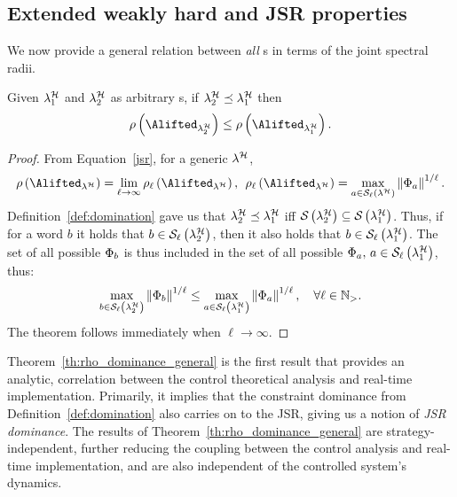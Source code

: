 \subsection{Extended weakly hard and JSR properties}
\label{sec:analytic_results}
We now provide a general relation between \emph{all} \ewhc{}s in terms of the joint spectral radii.
%
\begin{theorem}
    \label{th:rho_dominance_general}
    Given $\lambda_1^{\mathcal{H}}$ and $\lambda_2^{\mathcal{H}}$ as arbitrary \ewhc{}s, if $\lambda_2^{\mathcal{H}} \preceq \lambda_1^{\mathcal{H}}$ then
    $$
        \rho\funof{\Alifted_{\lambda_2^\strat}} \leq \rho\funof{\Alifted_{\lambda_1^\strat}}.
    $$
%
    \begin{proof}
        From Equation~\eqref{jsr}, for a generic \ewhc{} $\lambda^{\mathcal{H}}$,
        \begin{equation*}
            \rho\left(\Alifted_{\lambda^\strat}\right) = \lim_{\ell\rightarrow \infty} \rho_\ell \left(\Alifted_{\lambda^\strat}\right), \;\, 
            \rho_\ell\left(\Alifted_{\lambda^\strat}\right) = \max_{a \in \sset{\ell}{\lambda^\strat}}\norm{\clmat_{a}}^{1/\ell}.
        \end{equation*}
        Definition~\ref{def:domination} gave us that $\lambda^{\mathcal{H}}_2 \preceq \lambda^{\mathcal{H}}_1$ iff $\mathcal{S}_{}\left( \lambda^{\mathcal{H}}_2 \right) \subseteq \mathcal{S}_{}\left( \lambda^{\mathcal{H}}_1 \right)$.
        Thus, if for a word $b$ it holds that $b \in \mathcal{S}_{\ell}\left( \lambda^{\mathcal{H}}_2 \right)$, then it also holds that $b \in \mathcal{S}_{\ell}\left( \lambda^{\mathcal{H}}_1 \right)$.
        The set of all possible $\Phi_{b}$ is thus included in the set of all possible $\Phi_{a},\, a \in \mathcal{S}_{\ell}\left( \lambda^{\mathcal{H}}_1 \right)$, thus:
        \begin{equation*}
            \max_{b \in \mathcal{S}_{\ell}\left( \lambda^{\mathcal{H}}_2 \right)}\left\lVert\Phi_{b}\right\rVert^{1/\ell} \leq
            \max_{a \in \mathcal{S}_{\ell}\left( \lambda^{\mathcal{H}}_1 \right)}\left\lVert\Phi_{a}\right\rVert^{1/\ell}, \quad \forall \ell \in \mathbb{N}_{>}.
        \end{equation*}
        The theorem follows immediately when $\ell\rightarrow \infty$.
    \end{proof}
\end{theorem}
%
Theorem~\ref{th:rho_dominance_general} is the first result that provides an analytic, correlation between the control theoretical analysis and real-time implementation.
Primarily, it implies that the constraint dominance from Definition~\ref{def:domination} also carries on to the JSR, giving us a notion of \emph{JSR dominance}.
The results of Theorem~\ref{th:rho_dominance_general} are strategy-independent, further reducing the coupling between the control analysis and real-time implementation, and are also independent of the controlled system's dynamics.

